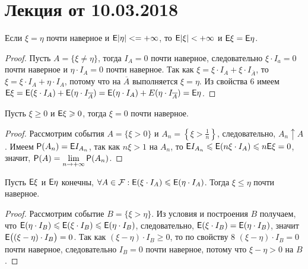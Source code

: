 \section{Лекция от 10.03.2018}
\begin{property}
	Если $\xi = \eta$ почти наверное и $\E | \eta| < = +\infty$, то $\E | \xi| < +\infty$ и $\E \xi = \E \eta$.
	\begin{proof}
		Пусть $A = \{ \xi \neq \eta \}$, тогда $I_A = 0$ почти наверное, следовательно $\xi \cdot I_a = 0$ почти наверное и $\eta \cdot I_A = 0$ почти наверное. Так как $\xi = \xi \cdot I_A + \xi \cdot I_{\overline A}$, то $\xi = \xi \cdot I_A + \eta \cdot I_A$, потому что на $\overline A$ выполняется $\xi = \eta$. Из свойства 6 имеем $\E \xi = \E ( \xi \cdot I_A ) + \E (\eta \cdot I_{\overline A} ) = \E ( \eta \cdot I_A) + E ( \eta \cdot I_{\overline A} ) = \E \eta$. 
	\end{proof}
\end{property}
\begin{property}
	Пусть $\xi \geqslant 0$ и $\E \xi \geqslant 0$, тогда $\xi = 0$ почти наверное.
	\begin{proof}
		Рассмотрим события $A = \{ \xi > 0 \}$ и $A_n = \left\{ \xi > \frac{1}{n} \right\} $, следовательно, $A_n \uparrow A$. Имеем $\P (A_n) = \E I_{A_n}$, так как $n\xi > 1$ на $A_n$, то  $\E I_{A_n} \leqslant \E (n\xi \cdot I_A) \leqslant n \E \xi = 0$, значит, $\P(A) = \lim\limits_{n \rightarrow +\infty} \P (A_n)$.
	\end{proof}
\end{property}
\begin{property}
	Пусть $\E \xi$ и $\E \eta$ конечны, $\forall A \in \F: \E (\xi \cdot I_A) \leqslant \E ( \eta \cdot I_A)$. Тогда  $\xi \leqslant \eta$ почти наверное.
	\begin{proof}
		Рассмотрим событие $B = \{ \xi > \eta \}$. Из условия и построения $B$ получаем, что $\E (\eta \cdot I_B) \leqslant \E (\xi \cdot I_B) \leqslant \E (\eta \cdot I_B)$, следовательно, $\E( \xi \cdot I_B) = \E(\eta \cdot I_B)$, значит $\E \big( (\xi - \eta) \cdot I_B \big) = 0$. Так как $(\xi - \eta) \cdot I_B \geqslant 0$, то по свойству 8 $(\xi - \eta) \cdot I_B = 0$ почти наверное, следовательно $I_B = 0$ почти наверное, потому что $\xi- \eta > 0$ на $B$.
	\end{proof}
\end{property}
